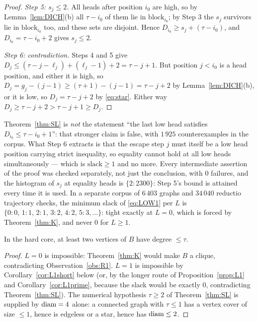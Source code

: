 \begin{proof}
\emph{Step 5: $s_j \le 2$.} All heads after position $i_0$ are high, so by
Lemma~\ref{lem:DICH}(b) all $\tau - i_0$ of them lie in $\mathrm{block}_{i_0}$; by Step 3
the $s_j$ survivors lie in $\mathrm{block}_{i_0}$ too, and these sets are disjoint. Hence
$D_{i_0} \ge s_j + (\tau-i_0)$, and $D_{i_0} = \tau-i_0+2$ gives $s_j \le 2$.

\emph{Step 6: contradiction.} Steps 4 and 5 give
$D_j \le (\tau-j-\ell_j) + (\ell_j-1) + 2 = \tau-j+1$. But position $j < i_0$ is a head
position, and either it is high, so $D_j = g_j - (j-1) \ge (\tau+1)-(j-1) = \tau-j+2$ by
Lemma~\ref{lem:DICH}(b), or it is low, so $D_j = \tau-j+2$ by \eqref{eq:star}. Either way
$D_j \ge \tau-j+2 > \tau-j+1 \ge D_j$.
\end{proof}

\begin{remark}[sharpness]\label{rem:SLsharp}
Theorem~\ref{thm:SL} is \emph{not} the statement ``the last low head satisfies
$D_{i_0} \le \tau - i_0 + 1$'': that stronger claim is false, with $1\,925$ counterexamples
in the corpus. What Step 6 extracts is that the escape step $j$ must itself be a low head
position carrying strict inequality, so equality cannot hold at all low heads
simultaneously --- which is $\mathrm{slack} \ge 1$ and no more. Every intermediate
assertion of the proof was checked separately, not just the conclusion, with $0$ failures,
and the histogram of $s_j$ at equality heads is $\{2 : 2300\}$: Step 5's bound is attained
every time it is used. In a separate corpus of $6\,403$ graphs and $34\,040$ reductio
trajectory checks, the minimum slack of \eqref{eq:LOW1} per $L$ is
$\{0:0,\,1:1,\,2:1,\,3:2,\,4:2,\,5:3,\dots\}$: tight exactly at $L = 0$, which is forced by
Theorem~\ref{thm:K}, and never $0$ for $L \ge 1$.
\end{remark}

\begin{corollary}\label{cor:SLHC}
In the hard core, at least two vertices of $B$ have degree $\le \tau$.
\end{corollary}

\begin{proof}
$L = 0$ is impossible: Theorem~\ref{thm:K} would make $B$ a clique, contradicting
Observation~\ref{obs:R1}. $L = 1$ is impossible by Corollary~\ref{cor:L1short} below (or,
by the longer route of Proposition~\ref{prop:L1} and Corollary~\ref{cor:L1prime}, because
the slack would be exactly $0$, contradicting Theorem~\ref{thm:SL}). The numerical
hypothesis $\tau \ge 2$ of Theorem~\ref{thm:SL} is supplied by $\operatorname{diam} = 4$ alone: a
connected graph with $\tau \le 1$ has a vertex cover of size $\le 1$, hence is edgeless or a
star, hence has $\operatorname{diam} \le 2$.
\end{proof}

